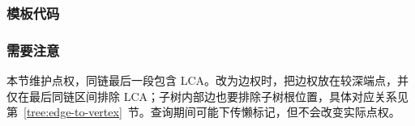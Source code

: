 \subsubsection*{模板代码}
\subsubsection*{需要注意}
本节维护点权，同链最后一段包含 LCA。改为边权时，把边权放在较深端点，并仅在最后同链区间排除 LCA；子树内部边也要排除子树根位置，具体对应关系见第~\ref{tree:edge-to-vertex}~节。查询期间可能下传懒标记，但不会改变实际点权。
